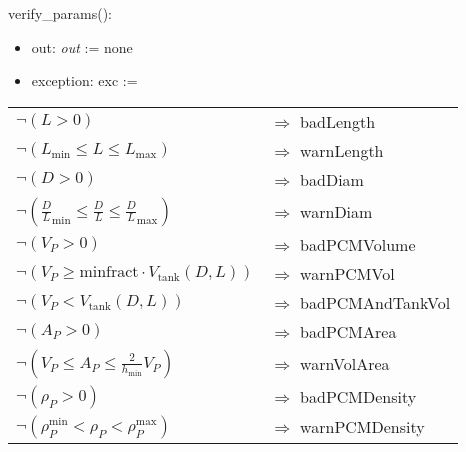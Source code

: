 \documentclass[12pt]{article}
\begin{document}
\noindent verify\_params():
\begin{itemize}
\item out: \textit{out} := none
\item exception: exc := 
\end{itemize}
\noindent \begin{longtable*}[l]{l l} 
$\neg (L > 0)$ & $\Rightarrow$ badLength\\
$\neg (L_{\text{min}} \leq L \leq L_{\text{max}})$ & $\Rightarrow$ warnLength\\
$\neg (D > 0)$ & $\Rightarrow$ badDiam\\
$\neg ({\frac{D}{L}}_\text{min} \leq \frac{D}{L} \leq {\frac{D}{L}}_\text{max})$ & $\Rightarrow$ warnDiam\\
$\neg (V_P > 0)$ & $\Rightarrow$ badPCMVolume\\
$ \neg (V_P \geq \text{minfract} \cdot V_{\text{tank}}(D, L)) $ & $\Rightarrow$ warnPCMVol\\
$\neg (V_P < V_{\text{tank}}(D, L))$ & $\Rightarrow$ badPCMAndTankVol\\
$\neg (A_P > 0)$ & $\Rightarrow$ badPCMArea\\
$\neg (V_P \leq A_P \leq \frac{2}{h_\text{min}} V_P)$ & $\Rightarrow$ warnVolArea\\
$\neg (\rho_P > 0)$  & $\Rightarrow$ badPCMDensity\\
$\neg (\rho_P^{\text{min}} < \rho_P < \rho_P^{\text{max}})$ & $\Rightarrow$ warnPCMDensity\\

\end{longtable*}
\end{document}
